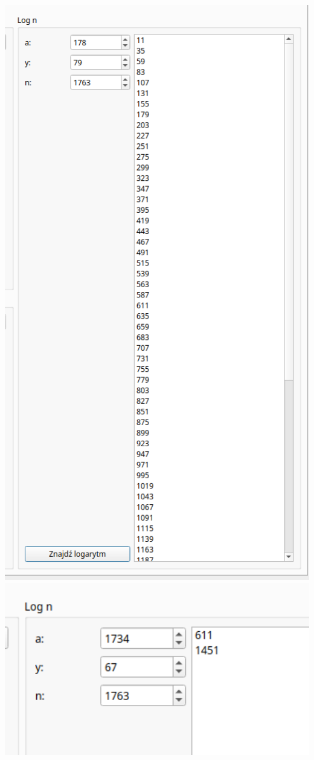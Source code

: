\documentclass{article}[12pt]
\begin{document}
\includegraphics[width=1\textwidth]{sixteen.png} 
\includegraphics[width=1\textwidth]{seventeen.png} 
\end{document}
